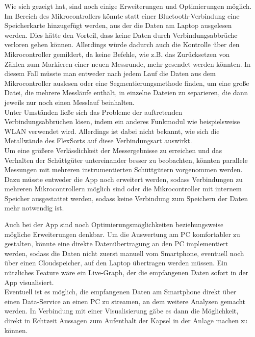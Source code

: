 Wie sich gezeigt hat, sind noch einige Erweiterungen und Optimierungen möglich. 
Im Bereich des Mikrocontrollers könnte statt einer Bluetooth-Verbindung eine Speicherkarte hinzugefügt werden, aus der die Daten am Laptop ausgelesen werden. Dies hätte den Vorteil, dass keine Daten durch Verbindungsabbrüche verloren gehen können. Allerdings würde dadurch auch die Kontrolle über den Mikrocontroller gemildert, da keine Befehle, wie z.B. das Zurücksetzen von Zählen zum Markieren einer neuen Messrunde, mehr gesendet werden könnten. In diesem Fall müsste man entweder nach jedem Lauf die Daten aus dem Mikrocontroller auslesen oder eine Segmentierungsmethode finden, um eine große Datei, die mehrere Messläufe enthält, in einzelne Dateien zu separieren, die dann jeweils nur noch einen Messlauf beinhalten. \\
Unter Umständen ließe sich das Probleme der auftretenden Verbindungsabbrüchen lösen, indem ein anderes Funkmodul wie beispielsweise WLAN verwendet wird. Allerdings ist dabei nicht bekannt, wie sich die Metallwände des FlexSorts auf diese Verbindungsart auswirkt.\\
Um eine größere Verlässlichkeit der Messergebnisse zu erreichen und das Verhalten der Schüttgüter untereinander besser zu beobachten, könnten parallele Messungen mit mehreren instrumentierten Schüttgütern vorgenommen werden. Dazu müsste entweder die App noch erweitert werden, sodass Verbindungen zu mehreren Mikrocontrollern möglich sind oder die Mikrocontroller mit internem Speicher ausgestattet werden, sodass keine Verbindung zum Speichern der Daten mehr notwendig ist.

Auch bei der App sind noch Optimierungsmöglichkeiten beziehungsweise mögliche Erweiterungen denkbar. Um die Auswertung am PC komfortabler zu gestalten, könnte eine direkte Datenübertragung an den PC implementiert werden, sodass die Daten nicht zuerst manuell vom Smartphone, eventuell noch über einen Cloudspeicher, auf den Laptop übertragen werden müssen. 
Ein nützliches Feature wäre ein Live-Graph, der die empfangenen Daten sofort in der App visualisiert.\\
Eventuell ist es möglich, die empfangenen Daten am Smartphone direkt über einen Data-Service an einen PC zu streamen, an dem weitere Analysen gemacht werden. In Verbindung mit einer Visualisierung gäbe es dann die Möglichkeit, direkt in Echtzeit Aussagen zum Aufenthalt der Kapsel in der Anlage machen zu können. 


